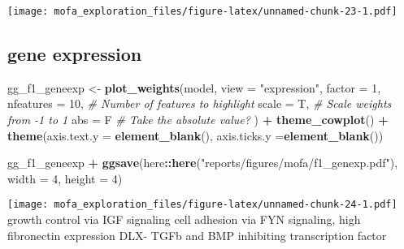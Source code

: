 \documentclass[
]{article}
\newenvironment{Shaded}{\begin{snugshade}}{\end{snugshade}}
\newcommand{\CommentTok}[1]{\textcolor[rgb]{0.56,0.35,0.01}{\textit{#1}}}
\newcommand{\DataTypeTok}[1]{\textcolor[rgb]{0.13,0.29,0.53}{#1}}
\newcommand{\DecValTok}[1]{\textcolor[rgb]{0.00,0.00,0.81}{#1}}
\newcommand{\KeywordTok}[1]{\textcolor[rgb]{0.13,0.29,0.53}{\textbf{#1}}}
\newcommand{\NormalTok}[1]{#1}
\newcommand{\OperatorTok}[1]{\textcolor[rgb]{0.81,0.36,0.00}{\textbf{#1}}}
\newcommand{\StringTok}[1]{\textcolor[rgb]{0.31,0.60,0.02}{#1}}
\begin{document}
\texttt{[image: mofa\_exploration\_files/figure-latex/unnamed-chunk-23-1.pdf]}

\hypertarget{gene-expression}{%
\subsection{gene expression}\label{gene-expression}}

\begin{Shaded}
\begin{Highlighting}[]
\NormalTok{gg_f1_geneexp <-}\StringTok{ }\KeywordTok{plot_weights}\NormalTok{(model,}
  \DataTypeTok{view =} \StringTok{"expression"}\NormalTok{,}
  \DataTypeTok{factor =} \DecValTok{1}\NormalTok{,}
  \DataTypeTok{nfeatures =} \DecValTok{10}\NormalTok{,     }\CommentTok{# Number of features to highlight}
  \DataTypeTok{scale =}\NormalTok{ T,          }\CommentTok{# Scale weights from -1 to 1}
  \DataTypeTok{abs =}\NormalTok{ F             }\CommentTok{# Take the absolute value?}
\NormalTok{) }\OperatorTok{+}\StringTok{ }
\StringTok{  }\KeywordTok{theme_cowplot}\NormalTok{() }\OperatorTok{+}\StringTok{ }
\StringTok{  }\KeywordTok{theme}\NormalTok{(}\DataTypeTok{axis.text.y =} \KeywordTok{element_blank}\NormalTok{(),}
        \DataTypeTok{axis.ticks.y =}\KeywordTok{element_blank}\NormalTok{()) }

\NormalTok{gg_f1_geneexp }\OperatorTok{+}\StringTok{ }
\StringTok{  }\KeywordTok{ggsave}\NormalTok{(here}\OperatorTok{::}\KeywordTok{here}\NormalTok{(}\StringTok{"reports/figures/mofa/f1_genexp.pdf"}\NormalTok{), }\DataTypeTok{width =} \DecValTok{4}\NormalTok{, }\DataTypeTok{height =} \DecValTok{4}\NormalTok{)}
\end{Highlighting}
\end{Shaded}

\texttt{[image: mofa\_exploration\_files/figure-latex/unnamed-chunk-24-1.pdf]}
growth control via IGF signaling cell adhesion via FYN signaling, high
fibronectin expression DLX- TGFb and BMP inhibiting transcription factor

\begin{Shaded}
\end{Shaded}
\end{document}
